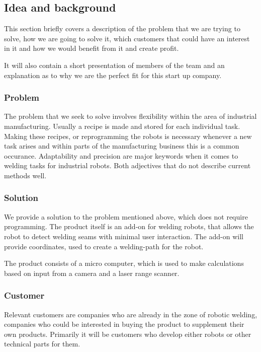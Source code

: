 \subsection{Idea and background}
This section briefly covers a description of the problem that we are trying to solve, how we are going to solve it, which customers that could have an interest in it and how we would benefit from it and create profit.

It will also contain a short presentation of members of the team and an explanation as to why we are the perfect fit for this start up company.

\subsubsection{Problem}
The problem that we seek to solve involves flexibility within the area of industrial manufacturing. Usually a recipe is made and stored for each individual task.
Making these recipes, or reprogramming the robots is necessary whenever a new task arises and within parts of the manufacturing business this is a common occurance. 
Adaptability and precision are major keywords when it comes to welding tasks for industrial robots. Both adjectives that do not describe current methods well.

\subsubsection{Solution}
We provide a solution to the problem mentioned above, which does not require programming. The product itself is an add-on for welding robots, that allows the robot to detect welding seams with minimal user interaction. The add-on will provide coordinates, used to create a welding-path for the robot. 

The product consists of a micro computer, which is used to make calculations based on input from a camera and a laser range scanner. 

\subsubsection{Customer}
Relevant customers are companies who are already in the zone of robotic welding, companies who could be interested in buying the product to supplement their own products. Primarily it will be customers who develop either robots or other technical parts for them.  

